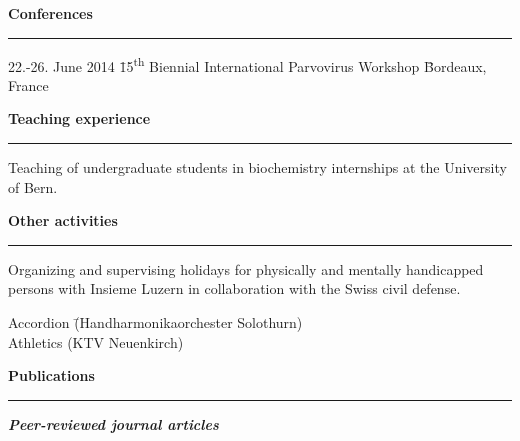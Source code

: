 \vspace{0.6 cm}
\large
\textbf{Conferences}
\noindent\rule[3mm]{\linewidth}{1pt}

\normalsize
\vspace{-0.7cm}
\begin{tabbing}
22.-26. June 2014 \hspace{1.38 cm} \= 15\textsuperscript{th} Biennial International Parvovirus Workshop \hspace{0.4 cm} \= Bordeaux, France

\end{tabbing}




\vspace{0.3 cm}
\large
\textbf{Teaching experience}
\noindent\rule[3mm]{\linewidth}{1pt}

\normalsize
\vspace{-0.5cm}
\vspace{0.2 cm}
Teaching of undergraduate students in biochemistry internships at the University of Bern.

\vspace{0.6 cm}
\large
\textbf{Other activities}
\noindent\rule[3mm]{\linewidth}{1pt}

\normalsize
\vspace{-0.5cm}
\vspace{0.2 cm}
Organizing and supervising holidays for physically and mentally handicapped persons with Insieme Luzern in collaboration with the Swiss civil defense.
\vspace{-0.1 cm}
\begin{tabbing}
Accordion \=(Handharmonikaorchester Solothurn) \\[0.15 cm]
Athletics \>(KTV Neuenkirch) 
\end{tabbing}

\vspace{0.3 cm}
\large
\textbf{Publications}
\noindent\rule[3mm]{\linewidth}{1pt}

\normalsize

\vspace{0.2 cm}
\vspace{-0.5cm}
\textbf{\emph{Peer-reviewed journal articles}} \\[0.3 cm]

